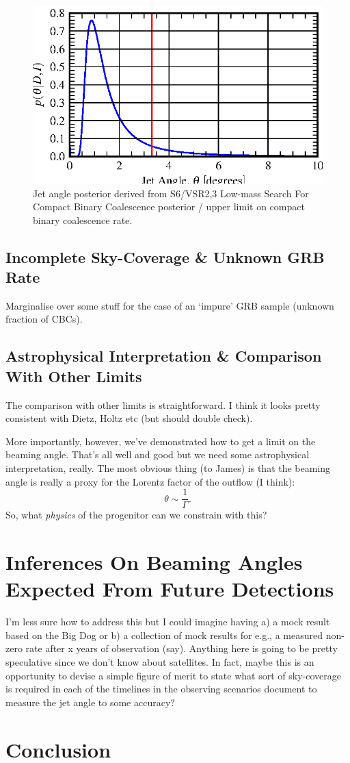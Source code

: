 \documentclass[twocolumn,nofootinbib]{revtex4}
\begin{document}
\begin{figure}
\includegraphics{jet_angle_posterior_s6UL.eps}
\caption{Jet angle posterior derived from S6/VSR2,3 Low-mass Search For Compact Binary
Coalescence posterior / upper limit on compact binary coalescence
rate.\label{fig:jetPosterior}}
\end{figure}

\subsection{Incomplete Sky-Coverage \& Unknown GRB Rate}
Marginalise over some stuff for the case of an `impure' GRB sample (unknown
fraction of CBCs).
\\

\subsection{Astrophysical Interpretation \& Comparison With Other Limits}
The comparison with other limits is straightforward.  I think it looks pretty
consistent with Dietz, Holtz etc (but should double check).

More importantly, however,  we've demonstrated how to get a limit on the beaming
angle.  That's all well and good but we need some astrophysical interpretation,
really.  The most obvious thing (to James) is that the beaming angle is really a
proxy for the Lorentz factor of the outflow (I think):
%
\begin{equation}
\theta \sim \frac{1}{\Gamma}.
\end{equation}
%
So, what \emph{physics} of the progenitor can we constrain with this?

\section{Inferences On Beaming Angles Expected From Future Detections}
I'm less sure how to address this but I could imagine having a) a mock result
based on the Big Dog or b) a collection of mock results for e.g., a measured
non-zero rate after x years of observation (say).  Anything here is going to be
pretty speculative since we don't know about satellites.  In fact, maybe this is
an opportunity to devise a simple figure of merit to state what sort of
sky-coverage is required in each of the timelines in the observing scenarios
document to measure the jet angle to some accuracy?

\section{Conclusion}


\end{document}
